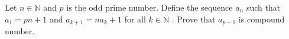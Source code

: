 Let $n\in\mathbb{N}$ and $p$ is the odd prime number. Define the sequence $a_n$ such that $a_1=pn+1$ and $a_{k+1}=na_k+1$ for all $k \in \mathbb{N}$ . Prove that $a_{p-1}$ is compound number.